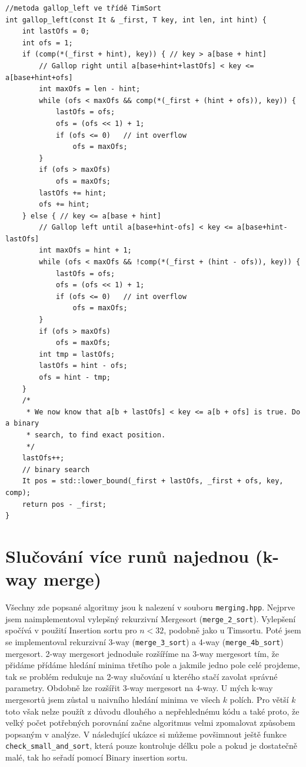 \documentclass[thesis=B,czech]{FITthesis}[2019/12/23]
\begin{document}
\begin{verbatim}
//metoda gallop_left ve třídě TimSort
int gallop_left(const It & _first, T key, int len, int hint) {
    int lastOfs = 0;
    int ofs = 1;
    if (comp(*(_first + hint), key)) { // key > a[base + hint]
        // Gallop right until a[base+hint+lastOfs] < key <= a[base+hint+ofs]
        int maxOfs = len - hint;
        while (ofs < maxOfs && comp(*(_first + (hint + ofs)), key)) {
            lastOfs = ofs;
            ofs = (ofs << 1) + 1;
            if (ofs <= 0)   // int overflow
                ofs = maxOfs;
        }
        if (ofs > maxOfs)
            ofs = maxOfs;
        lastOfs += hint;
        ofs += hint;
    } else { // key <= a[base + hint]
        // Gallop left until a[base+hint-ofs] < key <= a[base+hint-lastOfs]
        int maxOfs = hint + 1;
        while (ofs < maxOfs && !comp(*(_first + (hint - ofs)), key)) {
            lastOfs = ofs;
            ofs = (ofs << 1) + 1;
            if (ofs <= 0)   // int overflow
                ofs = maxOfs;
        }
        if (ofs > maxOfs)
            ofs = maxOfs;
        int tmp = lastOfs;
        lastOfs = hint - ofs;
        ofs = hint - tmp;
    }
    /*
     * We now know that a[b + lastOfs] < key <= a[b + ofs] is true. Do a binary
     * search, to find exact position.
     */
    lastOfs++;
    // binary search
    It pos = std::lower_bound(_first + lastOfs, _first + ofs, key, comp);
    return pos - _first;
}
\end{verbatim}

\section{Slučování více runů najednou (k-way merge)}


Všechny zde popsané algoritmy jsou k nalezení v souboru \texttt{merging.hpp}. Nejprve jsem naimplementoval vylepšný rekurzivní Mergesort (\texttt{merge\_2\_sort}). Vylepšení spočívá v použití Insertion sortu pro $n < 32$, podobně jako u Timsortu. Poté jsem se implementoval rekurzivní 3-way (\texttt{merge\_3\_sort}) a 4-way (\texttt{merge\_4b\_sort}) mergesort. 2-way mergesort jednoduše rozšíříme na 3-way mergesort tím, že přidáme přídáme hledání minima třetího pole a jakmile jedno pole celé projdeme, tak se problém redukuje na 2-way slučování u kterého stačí zavolat správné parametry. Obdobně lze rozšířit 3-way mergesort na 4-way. U mých k-way mergesortů jsem zůstal u naivního hledání minima ve všech $ k $ polích. Pro větší $k$ toto však nelze použít z důvodu dlouhého a nepřehlednému kódu a také proto, že velký počet potřebných porovnání začne algoritmus velmi zpomalovat způsobem popsaným v analýze. V následující ukázce si můžeme povšimnout ještě funkce \texttt{check\_small\_and\_sort}, která pouze kontroluje délku pole a pokud je dostatečně malé, tak ho seřadí pomocí Binary insertion sortu.
\end{document}

